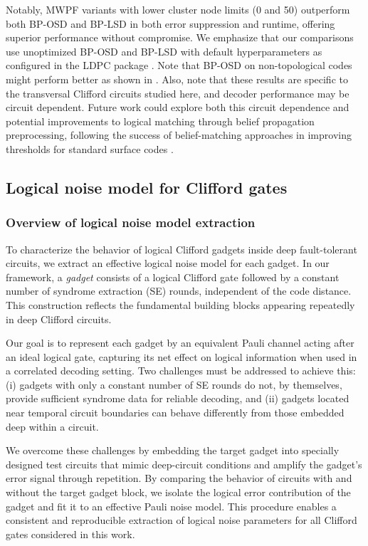 \documentclass[aps, prx, reprint, superscriptaddress, longbibliography, floatfix]{revtex4-2}
\begin{document}
Notably, MWPF variants with lower cluster node limits (0 and 50) outperform both BP-OSD and BP-LSD in both error suppression and runtime, offering superior performance without compromise.  We emphasize that our comparisons use unoptimized BP-OSD and BP-LSD with default hyperparameters as configured in the LDPC package \cite{Roffe_LDPC_tools}. Note that BP-OSD on non-topological codes might perform better as shown in \cite{wu2025mwpf}. Also, note that these results are specific to the transversal Clifford circuits studied here, and decoder performance may be circuit dependent. Future work could explore both this circuit dependence and potential improvements to logical matching through belief propagation preprocessing, following the success of belief-matching approaches in improving thresholds for standard surface codes \cite{higgott2023}.

\subsection{Logical noise model for Clifford gates}
\label{sec:cliffordnoise}

\subsubsection{Overview of logical noise model extraction}
\label{sec:extraction}

To characterize the behavior of logical Clifford gadgets inside deep fault-tolerant circuits, we extract an effective logical noise model for each gadget. In our framework, a \emph{gadget} consists of a logical Clifford gate followed by a constant number of syndrome extraction (SE) rounds, independent of the code distance. This construction reflects the fundamental building blocks appearing repeatedly in deep Clifford circuits.

Our goal is to represent each gadget by an equivalent Pauli channel acting after an ideal logical gate, capturing its net effect on logical information when used in a correlated decoding setting. Two challenges must be addressed to achieve this: (i) gadgets with only a constant number of SE rounds do not, by themselves, provide sufficient syndrome data for reliable decoding, and (ii) gadgets located near temporal circuit boundaries can behave differently from those embedded deep within a circuit.

We overcome these challenges by embedding the target gadget into specially designed test circuits that mimic deep-circuit conditions and amplify the gadget’s error signal through repetition. By comparing the behavior of circuits with and without the target gadget block, we isolate the logical error contribution of the gadget and fit it to an effective Pauli noise model. This procedure enables a consistent and reproducible extraction of logical noise parameters for all Clifford gates considered in this work.
\end{document}
